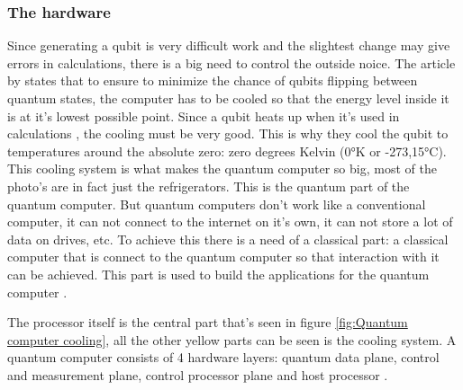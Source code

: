 \subsubsection{The hardware}
Since generating a qubit is very difficult work and the slightest change may give errors in calculations, there is a big need to control the outside noice.
The article by \textcite{Cooling} states that to ensure to minimize the chance of qubits flipping between quantum states, the computer has to be cooled so that the energy level inside it is at it's lowest possible point.
Since a qubit heats up when it's used in calculations \autocite{Cooling}, the cooling must be very good. This is why they cool the qubit to temperatures around the absolute zero: zero degrees Kelvin (0°K or -273,15°C).
This cooling system is what makes the quantum computer so big, most of the photo's are in fact just the refrigerators. This is the quantum part of the quantum computer. But quantum computers don't work like a conventional computer, it can not connect to the internet on it's own, it can not store a lot of data on drives, etc.
To achieve this there is a need of a classical part: a classical computer that is connect to the quantum computer so that interaction with it can be achieved. This part is used to build the applications for the quantum computer \autocite{qhardware}.

The processor itself is the central part that's seen in figure \ref*{fig:Quantum computer cooling}, all the other yellow parts can be seen is the cooling system.
A quantum computer consists of 4 hardware layers: quantum data plane, control and measurement plane, control processor plane and host processor \autocite{qhardware}.

